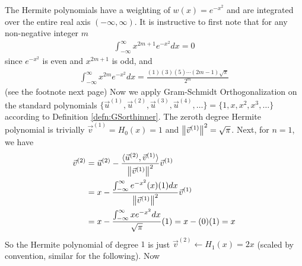 \begin{solution}
The Hermite polynomials have a weighting of $w(x) = e^{-x^2}$ and are integrated over the entire real axis $(-\infty, \infty)$. It is instructive to first note that for any non-negative integer $m$
\begin{align*}
\int_{-\infty}^{\infty} x^{2m+1}e^{-x^2} dx = 0
\end{align*}
since $e^{-x^2}$ is even and $x^{2m+1}$ is odd, and
\begin{align*}
\int_{-\infty}^{\infty} x^{2m}e^{-x^2} dx = \frac{(1)(3)(5)\cdots(2m-1)\sqrt{\pi}}{2^m}
\end{align*}
(see the footnote next page)\footnotemark{} Now we apply Gram-Schmidt Orthogonalization on the standard polynomials $\{\vec{u}^{(1)}, \vec{u}^{(2)}, \vec{u}^{(3)}, \vec{u}^{(4)}, \ldots\} = \{1, x, x^2, x^3, \ldots\}$ according to Definition \ref{defn:GSorthinner}. The zeroth degree Hermite polynomial is trivially $\vec{v}^{(1)} = H_0(x) = 1$ and $\norm{\vec{v}^{(1)}}^2 = \sqrt{\pi}$. Next, for $n=1$, we have
\begin{align*}
\vec{v}^{(2)} &= \vec{u}^{(2)} - \frac{\langle \vec{u}^{(2)}, \vec{v}^{(1)}\rangle}{\norm{\vec{v}^{(1)}}^2} \vec{v}^{(1)} \\
&= x - \frac{\int_{-\infty}^{\infty} e^{-x^2}(x)(1) dx}{\norm{\vec{v}^{(1)}}^2} \vec{v}^{(1)} \\
&= x - \frac{\int_{-\infty}^{\infty} xe^{-x^2} dx}{\sqrt{\pi}} (1) = x - (0)(1) = x
\end{align*}
So the Hermite polynomial of degree $1$ is just $\vec{v}^{(2)} \leftarrow H_1(x) = 2x$ (scaled by convention, similar for the following). Now
\end{solution}
